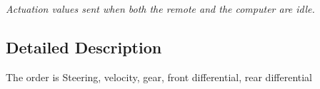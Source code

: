 \begin{DoxyCompactItemize}
\begin{DoxyCompactList}\small\item\em Actuation values sent when both the remote and the computer are idle. \end{DoxyCompactList}\end{DoxyCompactItemize}


\subsection{Detailed Description}
The order is Steering, velocity, gear, front differential, rear differential 